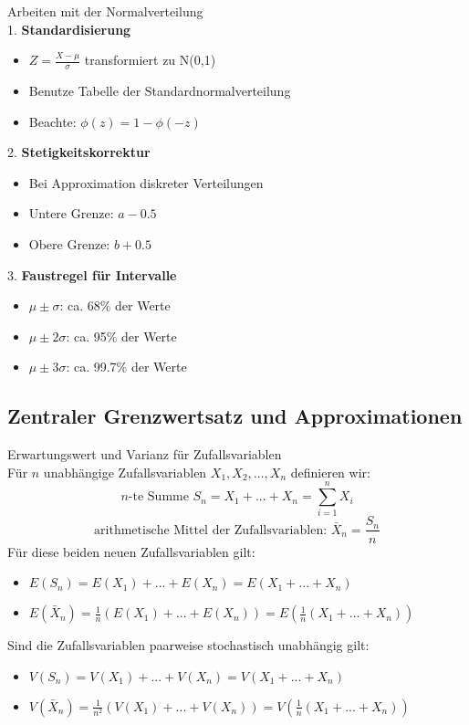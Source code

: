 \begin{KR}{Arbeiten mit der Normalverteilung}\\
1. \textbf{Standardisierung}
   \begin{itemize}
   \item $Z = \frac{X-\mu}{\sigma}$ transformiert zu N(0,1)
   \item Benutze Tabelle der Standardnormalverteilung
   \item Beachte: $\phi(z) = 1 - \phi(-z)$
   \end{itemize}

2. \textbf{Stetigkeitskorrektur}
   \begin{itemize}
   \item Bei Approximation diskreter Verteilungen
   \item Untere Grenze: $a - 0.5$
   \item Obere Grenze: $b + 0.5$
   \end{itemize}

3. \textbf{Faustregel für Intervalle}
   \begin{itemize}
   \item $\mu \pm \sigma$: ca. 68\% der Werte
   \item $\mu \pm 2\sigma$: ca. 95\% der Werte
   \item $\mu \pm 3\sigma$: ca. 99.7\% der Werte
   \end{itemize}
\end{KR}

\subsection{Zentraler Grenzwertsatz und Approximationen}

\begin{corollary}{Erwartungswert und Varianz für Zufallsvariablen}\\
Für $n$ unabhängige Zufallsvariablen $X_1, X_2, \ldots, X_n$ definieren wir:
$$n\text{-te Summe } S_n = X_1 + ... + X_n = \sum_{i=1}^n X_i$$
$$\text{arithmetische Mittel der Zufallsvariablen: } \bar{X}_n = \frac{S_n}{n}$$
Für diese beiden neuen Zufallsvariablen gilt:
\begin{itemize}
    \item $E(S_n) = E(X_1) + ... + E(X_n) = E(X_1 + ... + X_n)$
    \item $E(\bar{X}_n) = \frac{1}{n}(E(X_1) + ... + E(X_n)) = E(\frac{1}{n}(X_1 + ... + X_n))$
\end{itemize}
\vspace{1mm}
Sind die Zufallsvariablen paarweise stochastisch unabhängig gilt:
\begin{itemize}
    \item $V(S_n) = V(X_1) + ... + V(X_n) = V(X_1 + ... + X_n)$
    \item $V(\bar{X}_n) = \frac{1}{n^2}(V(X_1) + ... + V(X_n)) = V(\frac{1}{n}(X_1 + ... + X_n))$
\end{itemize}
\end{corollary}

